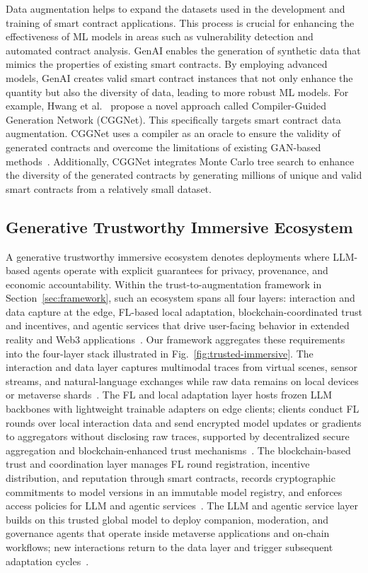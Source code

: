 \documentclass[5p,twocolumn]{elsarticle}
\begin{document}
Data augmentation helps to expand the datasets used in the development and training of smart contract applications. This process is crucial for enhancing the effectiveness of ML models in areas such as vulnerability detection and automated contract analysis. GenAI enables the generation of synthetic data that mimics the properties of existing smart contracts. By employing advanced models, GenAI creates valid smart contract instances that not only enhance the quantity but also the diversity of data, leading to more robust ML models. For example, Hwang et al.~\cite{hwang2024cggnet} propose a novel approach called Compiler-Guided Generation Network (CGGNet). This specifically targets smart contract data augmentation. CGGNet uses a compiler as an oracle to ensure the validity of generated contracts and overcome the limitations of existing GAN-based methods~\cite{sharma2024generative,saad2024survey,lim2024future}. Additionally, CGGNet integrates Monte Carlo tree search to enhance the diversity of the generated contracts by generating millions of unique and valid smart contracts from a relatively small dataset.


\subsection{Generative Trustworthy Immersive Ecosystem}
A generative trustworthy immersive ecosystem denotes deployments where LLM-based agents operate with explicit guarantees for privacy, provenance, and economic accountability. Within the trust-to-augmentation framework in Section~\ref{sec:framework}, such an ecosystem spans all four layers: interaction and data capture at the edge, FL-based local adaptation, blockchain-coordinated trust and incentives, and agentic services that drive user-facing behavior in extended reality and Web3 applications~\cite{zhang2025industrial,zuo2025federated}. Our framework aggregates these requirements into the four-layer stack illustrated in Fig.~\ref{fig:trusted-immersive}. The interaction and data layer captures multimodal traces from virtual scenes, sensor streams, and natural-language exchanges while raw data remains on local devices or metaverse shards~\cite{zhang2025industrial}. The FL and local adaptation layer hosts frozen LLM backbones with lightweight trainable adapters on edge clients; clients conduct FL rounds over local interaction data and send encrypted model updates or gradients to aggregators without disclosing raw traces, supported by decentralized secure aggregation and blockchain-enhanced trust mechanisms~\cite{zuo2025federated,li2025dsafl}. The blockchain-based trust and coordination layer manages FL round registration, incentive distribution, and reputation through smart contracts, records cryptographic commitments to model versions in an immutable model registry, and enforces access policies for LLM and agentic services~\cite{zuo2025federated,liu2025polylink,luo2025weighted}. The LLM and agentic service layer builds on this trusted global model to deploy companion, moderation, and governance agents that operate inside metaverse applications and on-chain workflows; new interactions return to the data layer and trigger subsequent adaptation cycles~\cite{bandara2024generative,golam2025blind,liu2025polylink}.
\end{document}

